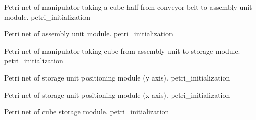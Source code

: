 

{Petri net of manipulator taking a cube half from conveyor belt to assembly unit
  module.}
{petri_initialization}


 
{Petri net of assembly unit module.}
{petri_initialization}



{Petri net of manipulator taking cube from assembly unit to storage module.}
{petri_initialization}



{Petri net of storage unit positioning module (y axis).}
{petri_initialization}



{Petri net of storage unit positioning module (x axis).}
{petri_initialization}



{Petri net of cube storage module.}
{petri_initialization}








